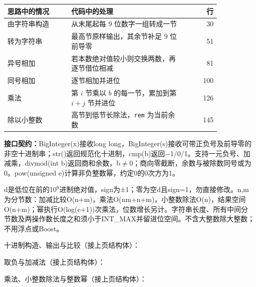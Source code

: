 \begin{center}\small
\begin{tabular}{@{}p{0.30\linewidth}p{0.55\linewidth}r@{}}
\toprule
思路中的情况 & 代码中的处理 & 行\\
\midrule
由字符串构造 & 从末尾起每 9 位数字一组转成一节 & 30\\
转为字符串 & 最高节原样输出，其余节补足 9 位前导零 & 51\\
异号相加 & 若本数绝对值较小则交换两数，再逐节借位相减 & 81\\
同号相加 & 逐节相加并进位 & 100\\
乘法 & 第 $i$ 节乘以 $b$ 的每一节，累加到第 $i+j$ 节并进位 & 126\\
除以小整数 & 高节到低节长除法，\texttt{rem} 为当前余数 & 145\\
\bottomrule
\end{tabular}
\end{center}



{\sloppy{}\noindent\textbf{接口契约：}BigInteger(x)接收long long，BigInteger(s)接收可带正负号及前导零的非空十进制串；str()返回规范化十进制，cmp(b)返回−1/0/1。支持一元负号、加减乘，divmod(int b)返回商和余数，b$\ne$0；商向零截断，余数与被除数同号或为0。pow(unsigned e)计算非负整数幂，约定0的0次方为1。

d是低位在前的10$^{9}$进制绝对值，sign为±1；零为空d且sign=1，勿直接修改。n,m为分节数：加减比较O(n+m)，乘法O(nm+n+m)，小整数除法O(n)，结果空间O(n+m)；幂执行O(log(e+1))次乘法，位数增长另计。字符串长度、所有中间分节数及两操作数长度之和须小于INT\_MAX并留进位空间。不含大整数除大整数；不用浮点或Boost。\par}

\Needspace{334pt}



\newpage

十进制构造、输出与比较（接上页结构体）：



\newpage

取负与加减法（接上页结构体）：



\newpage

乘法、小整数除法与整数幂（接上页结构体）：


